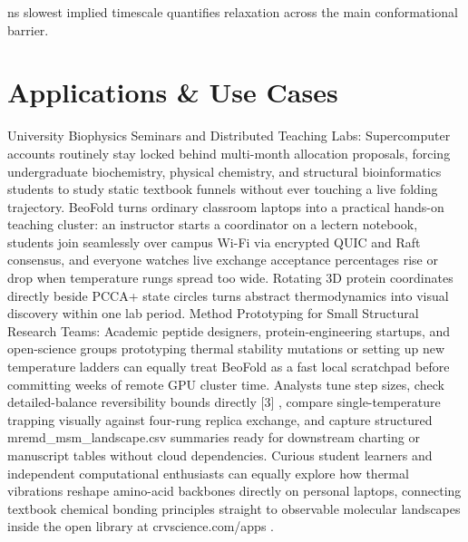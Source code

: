\documentclass[10pt,letterpaper]{article}
\begin{document}
ns slowest implied timescale quantifies relaxation across the main conformational barrier.

\section{Applications \& Use Cases}
University Biophysics Seminars and Distributed Teaching Labs: Supercomputer accounts routinely stay locked behind multi-month allocation proposals, forcing undergraduate biochemistry, physical chemistry, and structural bioinformatics students to study static textbook funnels without ever touching a live folding trajectory. BeoFold turns ordinary classroom laptops into a practical hands-on teaching cluster: an instructor starts a coordinator on a lectern notebook, students join seamlessly over campus Wi-Fi via encrypted QUIC and Raft consensus, and everyone watches live exchange acceptance percentages rise or drop when temperature rungs spread too wide. Rotating 3D protein coordinates directly beside PCCA+ state circles turns abstract thermodynamics into visual discovery within one lab period. Method Prototyping for Small Structural Research Teams: Academic peptide designers, protein-engineering startups, and open-science groups prototyping thermal stability mutations or setting up new temperature ladders can equally treat BeoFold as a fast local scratchpad before committing weeks of remote GPU cluster time. Analysts tune step sizes, check detailed-balance reversibility bounds directly [3] , compare single-temperature trapping visually against four-rung replica exchange, and capture structured mremd\_msm\_landscape.csv summaries ready for downstream charting or manuscript tables without cloud dependencies. Curious student learners and independent computational enthusiasts can equally explore how thermal vibrations reshape amino-acid backbones directly on personal laptops, connecting textbook chemical bonding principles straight to observable molecular landscapes inside the open library at crvscience.com/apps .
\end{document}
